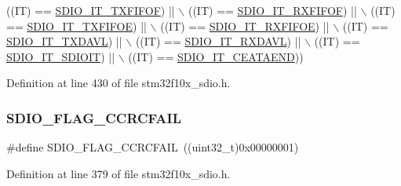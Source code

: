 \begin{DoxyCode}
                            ((IT)  == \hyperlink{group___s_d_i_o___interrupt__sources_ga3ec471bd9233561d6e929ebac6362b75}{SDIO\_IT\_TXFIFOF}) || \(\backslash\)
                            ((IT)  == \hyperlink{group___s_d_i_o___interrupt__sources_gae60a1d8e5a7caff85d84e513b093b8a8}{SDIO\_IT\_RXFIFOF}) || \(\backslash\)
                            ((IT)  == \hyperlink{group___s_d_i_o___interrupt__sources_gabff1466c2f2effbe30b80a11c132d7c0}{SDIO\_IT\_TXFIFOE}) || \(\backslash\)
                            ((IT)  == \hyperlink{group___s_d_i_o___interrupt__sources_ga80b01aaf64c873d21bfa95e5d98d8766}{SDIO\_IT\_RXFIFOE}) || \(\backslash\)
                            ((IT)  == \hyperlink{group___s_d_i_o___interrupt__sources_gac8e5744e6d977182a6fc7484a6f1195e}{SDIO\_IT\_TXDAVL}) || \(\backslash\)
                            ((IT)  == \hyperlink{group___s_d_i_o___interrupt__sources_gaf236079642db95772334d1e9b9b27570}{SDIO\_IT\_RXDAVL}) || \(\backslash\)
                            ((IT)  == \hyperlink{group___s_d_i_o___interrupt__sources_gaf5d7559460a9ff1fccc82d815de25cb4}{SDIO\_IT\_SDIOIT}) || \(\backslash\)
                            ((IT)  == \hyperlink{group___s_d_i_o___interrupt__sources_gae045cd5ba681d2df8b1031b8f659139a}{SDIO\_IT\_CEATAEND}))
\end{DoxyCode}


Definition at line 430 of file stm32f10x\+\_\+sdio.\+h.

\mbox{\label{group___s_d_i_o___flags_ga8ff1f3960378e05ec3c949940e1c49d0}} 
\subsubsection{\texorpdfstring{S\+D\+I\+O\+\_\+\+F\+L\+A\+G\+\_\+\+C\+C\+R\+C\+F\+A\+IL}{SDIO\_FLAG\_CCRCFAIL}}
{\footnotesize\ttfamily \#define S\+D\+I\+O\+\_\+\+F\+L\+A\+G\+\_\+\+C\+C\+R\+C\+F\+A\+IL~((uint32\+\_\+t)0x00000001)}



Definition at line 379 of file stm32f10x\+\_\+sdio.\+h.

\mbox{\label{group___s_d_i_o___flags_ga3c8d09a405944948e7a1c5493d49aff1}} 
